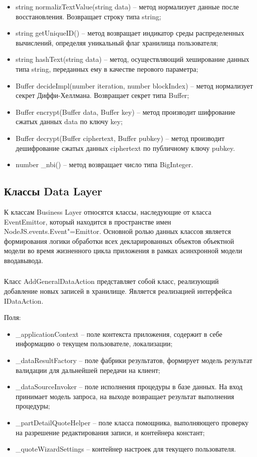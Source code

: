 \begin{itemize}
  \item string normalizTextValue(string data) – метод нормализует данные после восстановления. Возвращает строку типа string;
  \item string getUniqueID() – метод возвращает индикатор среды распределенных вычислений, определяя уникальный флаг хранилища пользователя;
  \item string hashText(string data) – метод, осуществляющий хеширование данных типа string, переданных ему в качестве перового параметра;
  \item Buffer decideImpl(number iteration, number  blockIndex) – метод нормализует секрет Диффи-Хеллмана. Возвращает секрет типа Buffer;
  \item Buffer encrypt(Buffer data, Buffer key) – метод производит шифрование сжатых данных data по ключу key;
  \item Buffer decrypt(Buffer ciphertext, Buffer pubkey) – метод производит дешифрование сжатых данных ciphertext по публичному ключу pubkey.
  \item number \_nbi() – метод возвращает число типа BigInteger.
\end{itemize}

\subsection{Классы Data Layer}
\label{sub:arch_and_mod:data_layer}

К классам Business Layer относятся классы, наследующие от класса EventEmittor, который находится в пространстве имен NodeJS.events.Event"=Emittor. Основной ролью данных классов является формирования логики обработки всех декларированных объектов объектной модели во время жизненного цикла приложения в рамках асинхронной модели ввода\/вывода.

\subsubsection{}
\label{sub:arch_and_mod:data_layer:add_general_data_action}

Класс AddGeneralDataAction представляет собой класс, реализующий добавление новых записей в хранилище. Является реализацией интерфейса IDataAction.

Поля:
\begin{itemize}
  \item \_applicationContext – поле контекста приложения, содержит в себе информацию о текущем пользователе, локализации;
  \item \_dataResultFactory – поле фабрики результатов, формирует модель результат валидации для дальнейшей передачи на клиент;
  \item \_dataSourceInvoker – поле исполнения процедуры в базе данных. На вход принимает модель запроса, на выходе возвращает результат выполнения процедуры;
  \item \_partDetailQuoteHelper – поле класса помощника, выполняющего проверку на разрешение редактирования записи, и контейнера констант;
  \item \_quoteWizardSettings – контейнер настроек для текущего пользователя.
\end{itemize}

